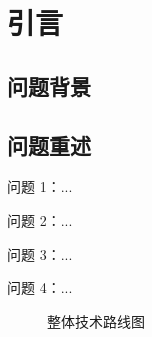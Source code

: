 \section{引言}
\subsection{问题背景}
\subsection{问题重述}
\noindent 问题 1：...

\noindent 问题 2：...

\noindent 问题 3：...

\noindent 问题 4：...

\begin{figure}[htbp]
	\centering
	\caption{整体技术路线图}
	\label{fig:overall-technical-route}
\end{figure}
